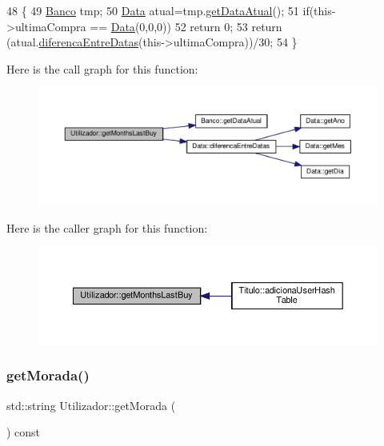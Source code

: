 \begin{DoxyCode}
48                                      \{
49     \hyperlink{classBanco}{Banco} tmp;
50     \hyperlink{classData}{Data} atual=tmp.\hyperlink{classBanco_a0735f07636c578666068a16f6ecccd91}{getDataAtual}();
51     \textcolor{keywordflow}{if}(this->ultimaCompra == \hyperlink{classData}{Data}(0,0,0))
52         \textcolor{keywordflow}{return} 0;
53     \textcolor{keywordflow}{return} (atual.\hyperlink{classData_a495d15dd0d90b595740f6e09fd0a2177}{diferencaEntreDatas}(this->ultimaCompra))/30;
54 \}
\end{DoxyCode}
Here is the call graph for this function\+:
\nopagebreak
\begin{figure}[H]
\begin{center}
\leavevmode
\includegraphics[width=350pt]{classUtilizador_a8c4c3275a56142c31f19c7af78e3c88f_cgraph}
\end{center}
\end{figure}
Here is the caller graph for this function\+:
\nopagebreak
\begin{figure}[H]
\begin{center}
\leavevmode
\includegraphics[width=350pt]{classUtilizador_a8c4c3275a56142c31f19c7af78e3c88f_icgraph}
\end{center}
\end{figure}
\mbox{\label{classUtilizador_aea27372a36fb8e59d2f3029464d83101}} 
\subsubsection{\texorpdfstring{get\+Morada()}{getMorada()}}
{\footnotesize\ttfamily std\+::string Utilizador\+::get\+Morada (\begin{DoxyParamCaption}{ }\end{DoxyParamCaption}) const}



